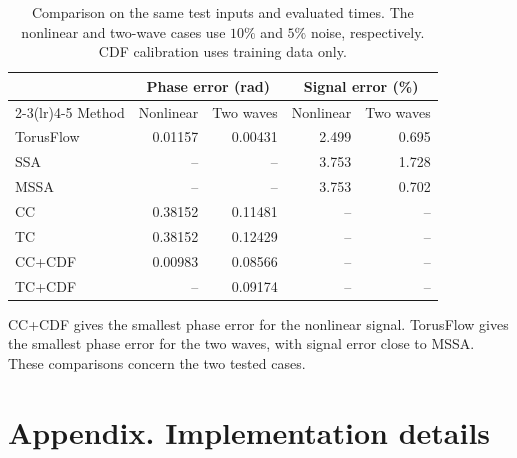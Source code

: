 \documentclass[11pt,a4paper]{article}
\begin{document}
\begin{table}[H]
\centering\small
\setlength{\tabcolsep}{9pt}
\begin{tabular}{lrrrr}
\toprule
& \multicolumn{2}{c}{Phase error (rad)} & \multicolumn{2}{c}{Signal error (\%)}\\
\cmidrule(lr){2-3}\cmidrule(lr){4-5}
Method & Nonlinear & Two waves & Nonlinear & Two waves\\
\midrule
TorusFlow & 0.01157 & 0.00431 & 2.499 & 0.695 \\
SSA & -- & -- & 3.753 & 1.728 \\
MSSA & -- & -- & 3.753 & 0.702 \\
CC & 0.38152 & 0.11481 & -- & -- \\
TC & 0.38152 & 0.12429 & -- & -- \\
CC+CDF & 0.00983 & 0.08566 & -- & -- \\
TC+CDF & -- & 0.09174 & -- & -- \\
\bottomrule
\end{tabular}
\caption{Comparison on the same test inputs and evaluated times.
The nonlinear and two-wave cases use $10\%$ and $5\%$ noise, respectively.
CDF calibration uses training data only.}
\label{tab:experiment-baselines}
\end{table}


CC+CDF gives the smallest phase error for the nonlinear signal.
TorusFlow gives the smallest phase error for the two waves, with signal
error close to MSSA. These comparisons concern the two tested cases.

\clearpage
\section*{Appendix. Implementation details}
\label{app:numerics}
\begingroup\small
\setlength{\parskip}{3pt}
\setlength{\topsep}{3pt}
\setlength{\partopsep}{0pt}
\setlength{\abovedisplayskip}{4pt}
\setlength{\belowdisplayskip}{4pt}
\end{document}
